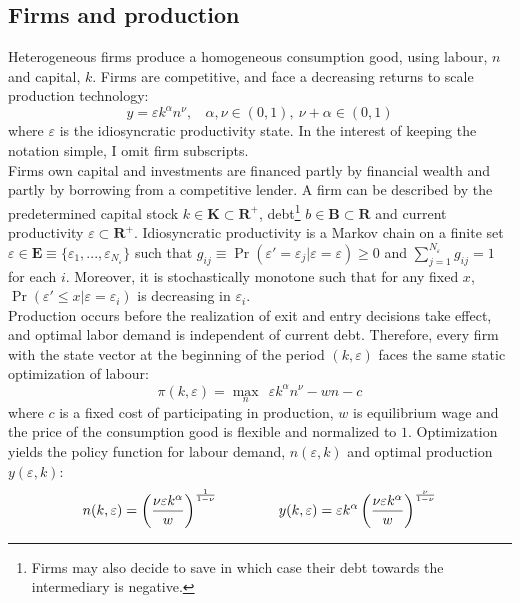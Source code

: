 \documentclass[12pt]{article}
\begin{document}
\subsection{Firms and production \label{sec:production}}

Heterogeneous firms produce a homogeneous consumption good, using labour, $n$ and capital, $k$. Firms are competitive, and face a decreasing returns to scale production technology:
\begin{equation} \label{eq:prodf}
y = \varepsilon k^{\alpha}n^{\nu}, \ \ \ \ \alpha,\nu \in (0,1),  \ \nu + \alpha \in (0,1)
\end{equation}  
where $\varepsilon$ is the idiosyncratic productivity state. In the interest of keeping the notation simple, I omit firm subscripts. \vspace{3mm} \\
Firms own capital and investments are financed partly by financial wealth and partly by borrowing from a competitive lender. A firm can be described by the predetermined capital stock $k \in \mathbf{K} \subset \mathbf{R^{+}}$, debt\footnote{Firms may also decide to save in which case their debt towards the intermediary is negative.} $b \in \mathbf{B} \subset \mathbf{R}$ and current productivity $\varepsilon \subset \mathbf{R^+}$. Idiosyncratic productivity is a Markov chain on a finite set $\varepsilon \in \mathbf{E} \equiv \{ \varepsilon_1,...,\varepsilon_{N_{\varepsilon}} \}$ such that $ g_{ij} \equiv \Pr(\varepsilon'= \varepsilon_j|\varepsilon = \varepsilon) \geq 0$ and $\sum_{j=1}^{N_{\varepsilon}} g_{ij} = 1$ for each $i$. Moreover, it is stochastically monotone such that for any fixed $x$, $\Pr(\varepsilon' \leq x | \varepsilon = \varepsilon_i)$ is decreasing in $\varepsilon_i$. \vspace{3mm} \\
Production occurs before the realization of exit and entry decisions take effect, and optimal labor demand is independent of current debt. Therefore, every firm with the state vector at the beginning of the period $(k,\varepsilon)$ faces the same static optimization of labour: 
$$ \pi(k,\varepsilon) = \max_{n} \ \  \varepsilon k^{\alpha}n^{\nu} - wn - c$$
where $c$ is a fixed cost of participating in production, $w$ is equilibrium wage and the price of the consumption good is flexible and normalized to $1$. Optimization yields the policy function for labour demand, $n(\varepsilon,k)$ and optimal production $y(\varepsilon,k)$: 
\begin{equation} \label{eq:opt_emp_prod}
n(k,\varepsilon) = \left( \dfrac{ \nu \varepsilon k^\alpha}{w} \right)^{\frac{1}{1-\nu}} \hspace{15mm}
y(k,\varepsilon) = \varepsilon k^{\alpha} \left( \dfrac{\nu \varepsilon k^\alpha}{w} \right)^{\frac{\nu}{1-\nu}}
\end{equation}  
\end{document}
